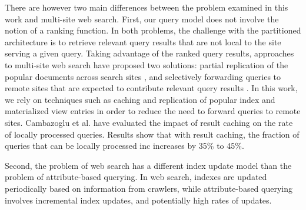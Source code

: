 \bigskip
\noindent
There are however two main differences between the problem examined in this work and multi-site web search.
First, our query model does not involve the notion of a ranking function.
In both problems, the challenge with the partitioned architecture is to retrieve relevant query results that are not
local to the site serving a given query.
Taking advantage of the ranked query results, approaches to multi-site web search have proposed two solutions:
partial replication of the popular documents across search sites \cite{frances:multisiteefficiency},
and selectively forwarding queries to remote sites that are expected to contribute relevant query results
\cite{yates:multisitefeasibility, cambazoglu:multisiteforwarding}.
In this work, we rely on techniques such as caching and replication of popular index and materialized view entries in
order to reduce the need to forward queries to remote sites.
Cambazoglu et al. \cite{cambazoglu:multisiteforwarding} have evaluated the impact of result caching
on the rate of locally processed queries.
Results show that with result caching, the fraction of queries that can be locally processed inc increases by 35\% to 45\%.

Second, the problem of web search has a different index update model than the problem of attribute-based querying.
In web search, indexes are updated periodically based on information from crawlers,
while attribute-based querying involves incremental index updates,
and potentially high rates of updates.



